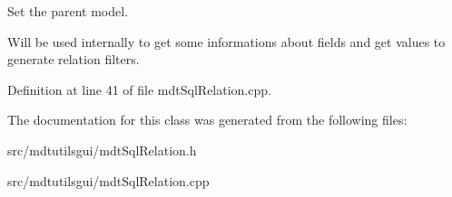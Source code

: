 Set the parent model. 

Will be used internally to get some informations about fields and get values to generate relation filters. 

Definition at line 41 of file mdtSqlRelation.cpp.



The documentation for this class was generated from the following files:\begin{DoxyCompactItemize}
\item 
src/mdtutilsgui/mdtSqlRelation.h\item 
src/mdtutilsgui/mdtSqlRelation.cpp\end{DoxyCompactItemize}

